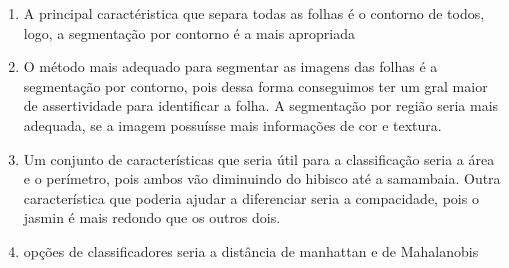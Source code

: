 \begin{question}
    \begin{enumerate}[label=\textbf{\alph*)}]
        \item A principal caractéristica que separa todas 
        as folhas é o contorno de todos, logo, a segmentação por contorno 
        é a mais apropriada
        \item O método mais adequado para segmentar as imagens 
        das folhas é a segmentação por contorno, pois dessa forma conseguimos
        ter um gral maior de assertividade para identificar a folha. A segmentação 
        por região seria mais adequada, se a imagem possuísse mais informações de cor 
        e textura.
        \item Um conjunto de características que seria útil 
        para a classificação seria a área e o perímetro, pois ambos 
        vão diminuindo do hibisco até a samambaia. Outra característica que 
        poderia ajudar a diferenciar seria a compacidade, pois o jasmin é mais 
        redondo que os outros dois.
        \item opções de classificadores seria a distância de manhattan 
        e de Mahalanobis
    \end{enumerate}
\end{question}